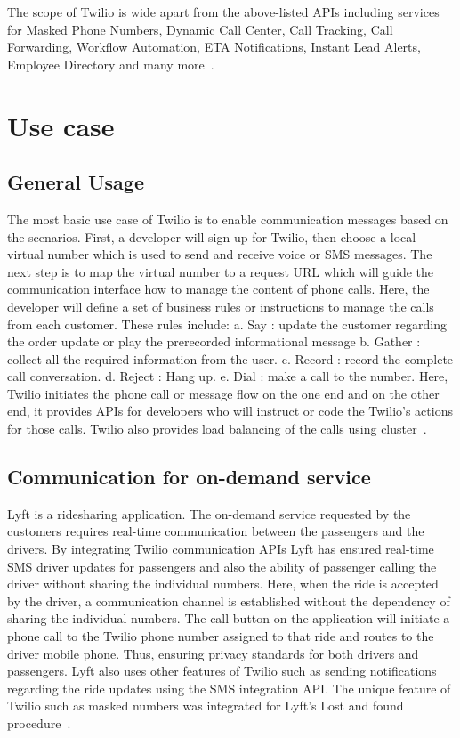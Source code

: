 {The scope of Twilio is wide apart from the above-listed APIs including services 
for Masked Phone Numbers, Dynamic Call Center, Call Tracking, Call Forwarding, 
Workflow Automation, ETA Notifications, Instant Lead Alerts, Employee Directory
and many more~\cite{hid-sp18-406-twilio-architecture4}.
   
\section{Use case}
 
\subsection{General Usage}

The most basic use case of Twilio is to enable communication messages based on 
the scenarios. First, a developer will sign up for Twilio, then choose a local 
virtual number which is used to send and receive voice or SMS messages. The next
step is to map the virtual number to a request URL which will guide the 
communication interface how to manage the content of phone calls. Here, the 
developer will define a set of business rules or instructions to manage the 
calls from each customer. These rules include: 
a. Say : update the customer regarding the order update or play the prerecorded 
informational message 
b. Gather : collect all the required information from the user. 
c. Record : record the complete call conversation. 
d. Reject : Hang up. 
e. Dial : make  a call to the number.
Here, Twilio initiates the phone call or message flow on the one end and on the 
other end, it provides APIs for developers who will instruct or code the 
Twilio's actions for those calls. Twilio also provides load balancing of the 
calls using cluster~\cite{hid-sp18-406-twilio-usecase1}.

\subsection{Communication for on-demand service}

Lyft is a ridesharing application. The on-demand service requested by the 
customers requires real-time communication between the passengers and the 
drivers. By integrating Twilio communication APIs Lyft has ensured real-time 
SMS driver updates for passengers and also the ability of passenger calling the
driver without sharing the individual numbers. Here, when the ride is accepted 
by the driver, a communication channel is established without the dependency of
sharing the individual numbers. The call button on the application will 
initiate a phone call to the Twilio phone number assigned to that ride and 
routes to the driver mobile phone. Thus, ensuring privacy standards for both
drivers and passengers. Lyft also uses other features of Twilio such as sending
notifications regarding the ride updates using the SMS integration API.  
The unique feature of Twilio such as masked numbers was integrated for Lyft's 
Lost and found procedure~\cite{hid-sp18-406-twilio-usecase1}.

}
